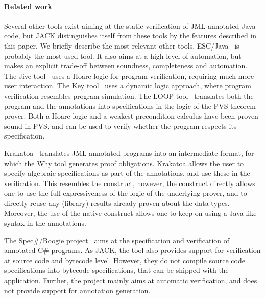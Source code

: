 
\paragraph{Related work}
Several other tools exist aiming at the static verification of
JML-annotated Java code, but JACK distinguishes itself from these
tools by the features described in this paper. We briefly describe the
most relevant other tools. ESC/Java~\cite{CokK04} is probably the most
used tool. It also aims at a high level of automation, but makes an
explicit trade-off between soundness, completeness and automation.
The Jive tool~\cite{MeyerP00} uses a Hoare-logic for program
verification, requiring much more user interaction. The Key
tool~\cite{BeckertHS07} uses a dynamic logic approach, where program
verification resembles program simulation. The LOOP
tool~\cite{BergJ01} translates both the program and the annotations
into specifications in the logic of the PVS theorem prover. Both a
Hoare logic and a weakest precondition calculus have been proven sound
in PVS, and can be used to verify whether the program respects its
specification.

Krakatoa~\cite{MarcheP-MU04} translates JML-annotated
programs into an intermediate format, for which the Why tool generates
proof obligations. Krakatoa allows the user to specify algebraic
specifications as part of the annotations, and use these in the
verification. This resembles the \native construct, however, the
\native construct directly allows one to use the full expressiveness
of the logic of the underlying prover, and to directly reuse any
(library) results already proven about the data types. Moreover, the
use of the native construct allows one to keep on using a Java-like
syntax in the annotations.

The Spec\#/Boogie project~\cite{BarnettLW04} aims at the specification
and verification of annotated C\# programs. As JACK, the tool also
provides support for verification at source code and bytecode
level. However, they do not compile source code specifications into
bytecode specifications, that can be shipped with the
application. Further, the project mainly aims at automatic
verification, and does not provide support for annotation generation.

